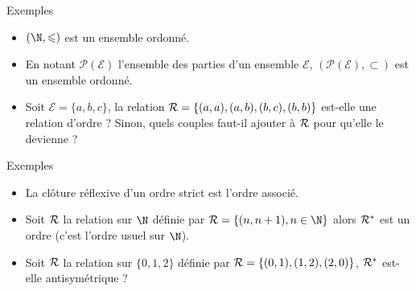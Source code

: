\documentclass[10pt]{beamer}
\begin{document}
\begin{frame}[fragile]{\Ctitle}{\stitle}
	\begin{exampleblock}{Exemples}
		\begin{itemize}
			\item<1-> $(\N, \leqslant)$ est un ensemble ordonné.
			\item<2-> En notant $\mathcal{P(E)}$ l'ensemble des parties d'un ensemble $\mathcal{E}$, $(\mathcal{P(E)}, \subset)$ est un ensemble ordonné.
			\item<3-> Soit $\mathcal{E} = \{a, b, c\}$, la relation $\mathcal{R} = \left\{(a,a), (a,b), (b,c), (b,b)\right\}$ est-elle une relation d'ordre ? Sinon, quels couples faut-il ajouter à $\mathcal{R}$ pour qu'elle le devienne ?
		\end{itemize}
	\end{exampleblock}
\end{frame}


\begin{frame}{\Ctitle}{\stitle}
	\begin{exampleblock}{Exemples}
		\begin{itemize}
			\item<1-> La clôture réflexive d'un ordre strict est l'ordre associé.
			\item<2-> Soit $\mathcal{R}$ la relation sur $\N$ définie par  $\MR = \{(n,n+1), n \in \N\}$ alors $\mathcal{R}^{*}$ est un ordre (c'est l'ordre usuel sur $\N$).
			\item<3-> Soit $\mathcal{R}$ la relation sur $\{0, 1, 2\}$ définie par $\mathcal{R} = \{(0,1), (1,2), (2,0)\}$, $\mathcal{R}^{*}$ est-elle antisymétrique ?
		\end{itemize}
	\end{exampleblock}
\end{frame}
\end{document}
